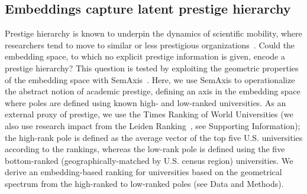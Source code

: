 \documentclass[12pt]{article} %
\def\SI{Supporting Information}
\begin{document}
%
%
\subsection*{Embeddings capture latent prestige hierarchy}

Prestige hierarchy is known to underpin the dynamics of scientific mobility, where researchers tend to move to similar or less prestigious organizations~\autocite{deville2014career, clauset2015hierarchy}. Could the embedding space, to which no explicit prestige information is given, encode a prestige hierarchy?
This question is tested by exploiting the geometric properties of the embedding space with SemAxis~\autocite{an2018semaxis}.
Here, we use SemAxis to operationalize the abstract notion of academic prestige, defining an axis in the embedding space where poles are defined using known high- and low-ranked universities.
As an external proxy of prestige, we use the Times Ranking of World Universities (we also use research impact from the Leiden Ranking~\autocite{waltman2012leidenrankings}, see \SI);
the high-rank pole is defined as the average vector of the top five U.S. universities according to the rankings, whereas the low-rank pole is defined using the five bottom-ranked (geographically-matched by U.S. census region) universities.
We derive an embedding-based ranking for universities based on the geometrical spectrum from the high-ranked to low-ranked poles (see Data and Methods).
\end{document}
